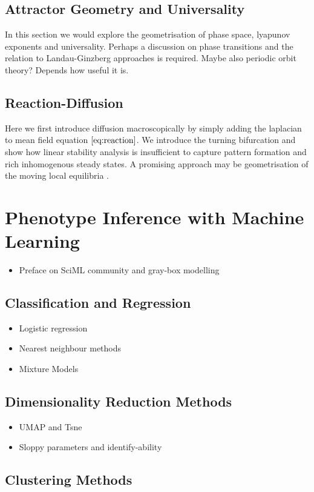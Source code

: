 \subsection{Attractor Geometry and Universality}
In this section we would explore the geometrisation of phase space, lyapunov
exponents and universality. Perhaps a discussion on phase transitions and
the relation to Landau-Ginzberg approaches is required.
Maybe also periodic orbit theory? Depends how useful it is.
\subsection{Reaction-Diffusion}
Here we first introduce diffusion macroscopically by simply adding the laplacian
to mean field equation $\eqref{eq:reaction}$. We introduce the turning bifurcation and
show how linear stability analysis is insufficient to capture pattern formation
and rich inhomogenous steady states. A promising approach may be geometrisation
of the moving local equilibria \cite{Halatek2018}.

\section{Phenotype Inference with Machine Learning}
\begin{itemize}
    \item Preface on SciML community and gray-box modelling
\end{itemize}

\subsection{Classification and Regression}
\begin{itemize}
    \item Logistic regression
    \item Nearest neighbour methods
    \item Mixture Models
\end{itemize}

\subsection{Dimensionality Reduction Methods}
\begin{itemize}
    \item UMAP and Tsne
    \item Sloppy parameters and identify-ability
\end{itemize}

\subsection{Clustering Methods}
